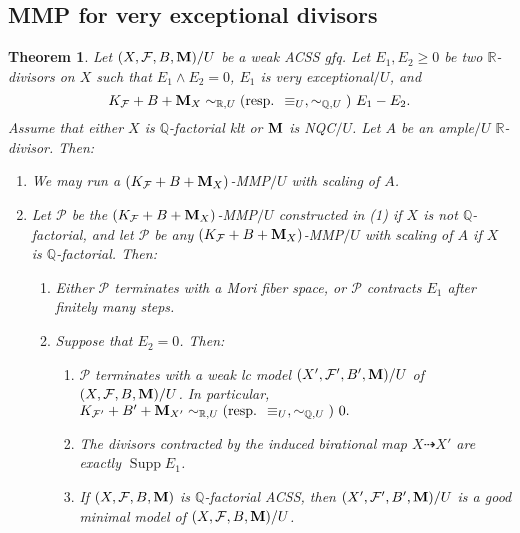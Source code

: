 \documentclass[11pt]{amsart}
\numberwithin{equation}{section}
\newcommand{\Mm}{{\bf{M}}}
\newcommand{\Qq}{\mathbb{Q}}
\newcommand{\Rr}{\mathbb{R}}
\newcommand{\Supp}{\operatorname{Supp}}
\newcommand{\Ff}{\mathcal{F}}
\newtheorem{thm}{Theorem}[subsection]
\theoremstyle{definition}
\theoremstyle{definition}
\theoremstyle{definition}
\begin{document}
\subsection{MMP for very exceptional divisors}\label{subsec: very exceptional}
\begin{thm}\label{thm: mmp very exceptional alg int fol}
Let $(X,\Ff,B,\Mm)/U$ be a weak ACSS gfq. Let $E_1,E_2\geq 0$ be two $\Rr$-divisors on $X$ such that $E_1\wedge E_2=0$, $E_1$ is very exceptional$/U$, and
$$K_{\Ff}+B+\Mm_X\sim_{\mathbb R,U}\text{(resp. }\equiv_U,\sim_{\mathbb Q,U}\text{) }E_1-E_2.$$ 
Assume that either $X$ is $\Qq$-factorial klt or $\Mm$ is NQC$/U$. Let $A$ be an ample$/U$ $\Rr$-divisor. Then:
\begin{enumerate}
    \item We may run a $(K_{\Ff}+B+\Mm_X)$-MMP$/U$ with scaling  of $A$.
    \item Let $\mathcal{P}$ be the $(K_{\Ff}+B+\Mm_X)$-MMP$/U$ constructed in (1) if $X$ is not $\Qq$-factorial, and let $\mathcal{P}$ be any $(K_{\Ff}+B+\Mm_X)$-MMP$/U$ with scaling of $A$ if $X$ is $\Qq$-factorial. Then:
    \begin{enumerate}
        \item  Either $\mathcal{P}$ terminates with a Mori fiber space, or $\mathcal{P}$ contracts $E_1$ after finitely many steps.
        \item Suppose that $E_2=0$. Then:
        \begin{enumerate}
        \item $\mathcal{P}$ terminates with a weak lc model $(X',\Ff',B',\Mm)/U$ of $(X,\Ff,B,\Mm)/U$. In particular,
        $K_{\Ff'}+B'+\Mm_{X'}\sim_{\mathbb R,U}\text{(resp. }\equiv_U,\sim_{\mathbb Q,U}\text{) }0.$
         \item The divisors contracted by the induced birational map $X\dashrightarrow X'$ are exactly $\Supp E_1$.
        \item If $(X,\Ff,B,\Mm)$ is $\Qq$-factorial ACSS, then $(X',\Ff',B',\Mm)/U$ is a good minimal model of $(X,\Ff,B,\Mm)/U$. 
        \end{enumerate}
    \end{enumerate}
\end{enumerate}
\end{thm}
\end{document}
